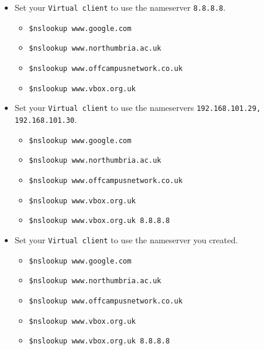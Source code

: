 \documentclass[11pt]{article}
\begin{document}
\begin{enumerate}
\begin{tcolorbox}[colback=blue!20]
\begin{itemize}
            \end{itemize}
        \end{tcolorbox}
        \begin{itemize}
            \item Set your \texttt{Virtual client} to use the nameserver \texttt{8.8.8.8}.
                \begin{itemize}
                    \item \texttt{\$nslookup www.google.com}
                    \item \texttt{\$nslookup www.northumbria.ac.uk}
                    \item \texttt{\$nslookup www.offcampusnetwork.co.uk}
                    \item \texttt{\$nslookup www.vbox.org.uk}
                \end{itemize} 
            \item Set your \texttt{Virtual client} to use the nameservers \texttt{192.168.101.29, 192.168.101.30}.
                \begin{itemize}
                    \item \texttt{\$nslookup www.google.com}
                    \item \texttt{\$nslookup www.northumbria.ac.uk}
                    \item \texttt{\$nslookup www.offcampusnetwork.co.uk}
                    \item \texttt{\$nslookup www.vbox.org.uk}
                    \item \texttt{\$nslookup www.vbox.org.uk 8.8.8.8}
                \end{itemize} 
            \item Set your \texttt{Virtual client} to use the nameserver you created.
                \begin{itemize}
                    \item \texttt{\$nslookup www.google.com}
                    \item \texttt{\$nslookup www.northumbria.ac.uk}
                    \item \texttt{\$nslookup www.offcampusnetwork.co.uk}
                    \item \texttt{\$nslookup www.vbox.org.uk}
                    \item \texttt{\$nslookup www.vbox.org.uk 8.8.8.8}
                \end{itemize} 
        \end{itemize}
    \end{enumerate}
    
\end{document}
